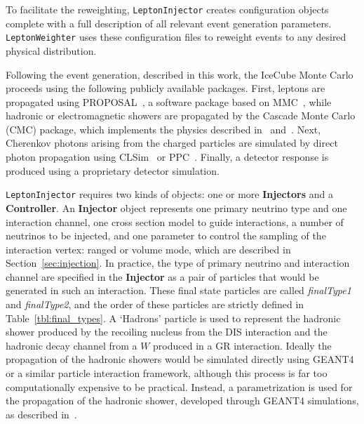 \documentclass[main.tex]{subfiles}
\newcommand{\LeptonInjector}{\texttt{LeptonInjector}}
\newcommand{\LeptonWeighter}{\texttt{LeptonWeighter}}
\begin{document}
To facilitate the reweighting, \LeptonInjector{} creates configuration objects complete with a full description of all relevant event generation parameters.
\LeptonWeighter{} uses these configuration files to reweight events to any desired physical distribution. 

Following the event generation, described in this work, the IceCube Monte Carlo proceeds using the following publicly available packages.
First, leptons are propagated using {\ttf PROPOSAL}~\cite{Koehne:2013gpa}, a software package based on {\ttf MMC}~\cite{Chirkin:2004hz}, while hadronic or electromagnetic showers are propagated by the {\ttf Cascade Monte Carlo} (CMC) package, which implements the physics described in~\cite{Niess_2006} and~\cite{Wiebusch:thesis,2012APh....38...53R,Radel:2012ij}.
Next, Cherenkov photons arising from the charged particles are simulated by direct photon propagation using {\ttf CLSim}~\cite{9041727,CLSim} or {\ttf PPC}~\cite{Chirkin:2015kga,PPCStandAlone}.
Finally, a detector response is produced using a proprietary detector simulation.

\LeptonInjector{} requires two kinds of objects: one or more \textbf{Injectors} and a \textbf{Controller}.
An \textbf{Injector} object represents one primary neutrino type and one interaction channel, one cross section model to guide interactions, a number of neutrinos to be injected, and one parameter to control the sampling of the interaction vertex: ranged or volume mode, which are described in Section~\ref{sec:injection}. 
In practice, the type of primary neutrino and interaction channel are specified in the \textbf{Injector} as a pair of particles that would be generated in such an interaction. 
These final state particles are called \textit{finalType1} and \textit{finalType2}, and the order of these particles are strictly defined in Table~\ref{tbl:final_types}. 
A `Hadrons' particle is used to represent the hadronic shower produced by the recoiling nucleus from the DIS interaction and the hadronic decay channel from a $W$ produced in a GR interaction. 
Ideally the propagation of the hadronic showers would be simulated directly using GEANT4 or a similar particle interaction framework, although this process is far too computationally expensive to be practical. 
Instead, a parametrization is used for the propagation of the hadronic shower, developed through GEANT4 simulations, as described in~\cite{Wiebusch:thesis}.
\end{document}
